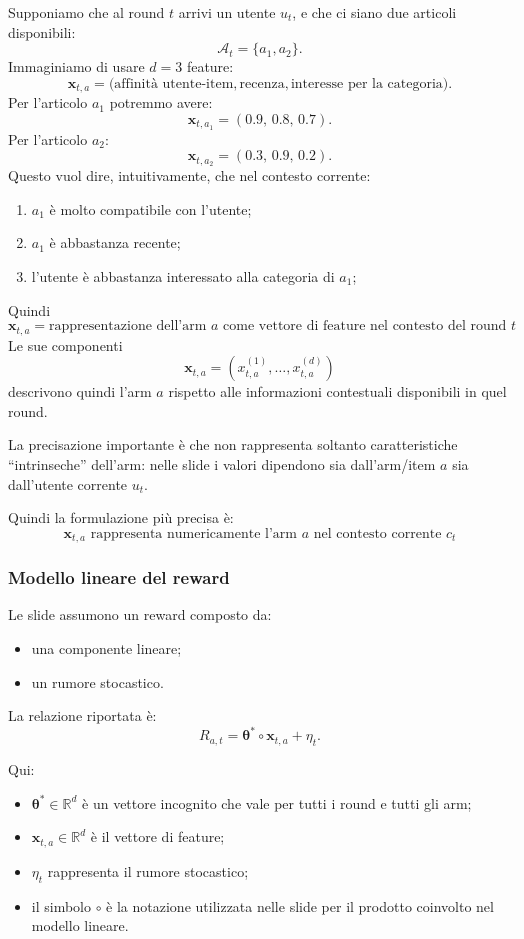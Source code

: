 \begin{example}{}
Supponiamo che al round \(t\) arrivi un utente \(u_t\), e che ci siano due articoli disponibili:
\[
\mathcal A_t=\{a_1,a_2\}.
\]
Immaginiamo di usare \(d=3\) feature:
\[
\mathbf{x}_{t,a}
=
\bigl(
\text{affinità utente-item},
\text{recenza},
\text{interesse per la categoria}
\bigr).
\]
Per l'articolo \(a_1\) potremmo avere:
\[
\mathbf{x}_{t,a_1}
=
(0.9,\,0.8,\,0.7).
\]
Per l'articolo \(a_2\):
\[
\mathbf{x}_{t,a_2}
=
(0.3,\,0.9,\,0.2).
\]
Questo vuol dire, intuitivamente, che nel contesto corrente:
\begin{enumerate}
    \item \(a_1\) è molto compatibile con l'utente;
    \item \(a_1\) è abbastanza recente;
    \item l'utente è abbastanza interessato alla categoria di \(a_1\);
\end{enumerate}
Quindi
\[
\boxed{
\mathbf{x}_{t,a}
=
\text{rappresentazione dell'arm }a\text{ come vettore di feature nel contesto del round }t
}
\]
Le sue componenti
\[
\mathbf{x}_{t,a}
=
\left(
x_{t,a}^{(1)},
\ldots,
x_{t,a}^{(d)}
\right)
\]
descrivono quindi l'arm \(a\) rispetto alle informazioni contestuali disponibili in quel round.

La precisazione importante è che non rappresenta soltanto caratteristiche “intrinseche” dell'arm: nelle slide i valori dipendono sia dall'arm/item \(a\) sia dall'utente corrente \(u_t\).

Quindi la formulazione più precisa è:
\[
\boxed{
\mathbf{x}_{t,a}
\text{ rappresenta numericamente l'arm }a
\text{ nel contesto corrente }c_t
}
\]
\end{example}

\subsubsection{Modello lineare del reward}

Le slide assumono un reward composto da:
\begin{itemize}
    \item una componente lineare;
    \item un rumore stocastico.
\end{itemize}

La relazione riportata è:
\[
R_{a,t}
=
\boldsymbol{\theta}^{*}
\circ
\mathbf{x}_{t,a}
+
\eta_t.
\]

Qui:
\begin{itemize}
    \item $\boldsymbol{\theta}^{*}\in\mathbb{R}^{d}$ è un vettore incognito che vale per tutti i round e tutti gli arm;
    \item $\mathbf{x}_{t,a}\in\mathbb{R}^{d}$ è il vettore di feature;
    \item $\eta_t$ rappresenta il rumore stocastico;
    \item il simbolo $\circ$ è la notazione utilizzata nelle slide per il prodotto coinvolto nel modello lineare.
\end{itemize}

